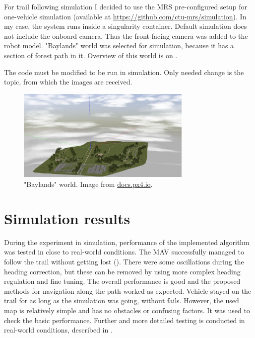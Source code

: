 For trail following simulation I decided to use the \acs{MRS} pre-configured setup for one-vehicle simulation (available at \url{https://github.com/ctu-mrs/simulation}). In my case, the system runs inside a singularity container. Default simulation does not include the onboard camera. Thus the front-facing camera was added to the robot model. "Baylands" world was selected for simulation, because it has a section of forest path in it. Overview of this world is on .

The code must be modified to be run in simulation. Only needed change is the topic, from which the images are received.

\begin{figure}[!h]

  \centering
  \includegraphics[width=0.75\textwidth]{./fig/photos/baylands.jpg}
  \caption{"Baylands" world. Image from \url{docs.px4.io}.}
  \label{fig:baylands}
\end{figure}


\section{Simulation results}

During the experiment in simulation, performance of the implemented algorithm was tested in close to real-world conditions. The \acs{MAV} successfully managed to follow the trail without getting lost (). There were some oscillations during the heading correction, but these can be removed by using more complex heading regulation and fine tuning. The overall performance is good and the proposed methods for navigation along the path worked as expected. Vehicle stayed on the trail for as long as the simulation was going, without fails. However, the used map is relatively simple and has no obstacles or confusing factors. It was used to check the basic performance. Further and more detailed testing is conducted in real-world conditions, described in .


